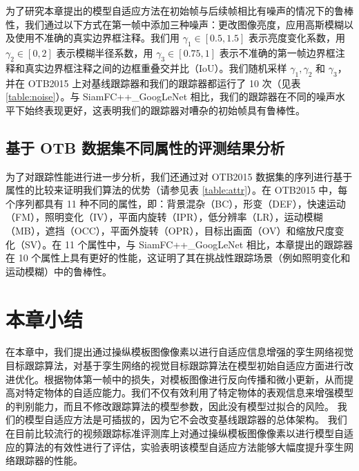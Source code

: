 为了研究本章提出的模型自适应方法在初始帧与后续帧相比有噪声的情况下的鲁棒性，我们通过以下方式在第一帧中添加三种噪声：更改图像亮度，应用高斯模糊以及使用不准确的真实边界框注释。我们用 $\gamma_1 \in [0.5, 1.5]$ 表示亮度变化系数，用 $\gamma_2 \in [0, 2]$ 表示模糊半径系数，用 $\gamma_3 \in [0.75, 1]$ 表示不准确的第一帧边界框注释和真实边界框注释之间的边框重叠交并比（IoU）。我们随机采样 $\gamma_1, \gamma_2$ 和 $\gamma_3$，并在 OTB2015 上对基线跟踪器和我们的跟踪器都运行了 10 次（见表 \ref{table:noise}）。与 SiamFC++\_GoogLeNet \cite{SiamFC++} 相比，我们的跟踪器在不同的噪声水平下始终表现更好，这表明我们的跟踪器对嘈杂的初始帧具有鲁棒性。%

\subsection{基于 OTB 数据集不同属性的评测结果分析}
为了对跟踪性能进行进一步分析，我们还通过对 OTB2015 数据集的序列进行基于属性的比较来证明我们算法的优势（请参见表 \ref{table:attr}）。在 OTB2015 中，每个序列都具有 11 种不同的属性，即：背景混杂（BC），形变（DEF），快速运动（FM），照明变化（IV），平面内旋转（IPR），低分辨率（LR），运动模糊（MB），遮挡（OCC），平面外旋转（OPR），目标出画面（OV）和缩放尺度变化（SV）。在 11 个属性中，与 SiamFC++\_GoogLeNet \cite{SiamFC++} 相比，本章提出的跟踪器在 10 个属性上具有更好的性能，这证明了其在挑战性跟踪场景（例如照明变化和运动模糊）中的鲁棒性。

\begin{table}[t!]
\centering
\caption{基于评测库 OTB2015 的 11 个属性标注的算法跟踪成功率对比展示。}
\label{table:attr}
\end{table}

\section{本章小结}
在本章中，我们提出通过操纵模板图像像素以进行自适应信息增强的孪生网络视觉目标跟踪算法，对基于孪生网络的视觉目标跟踪算法在模型初始自适应方面进行改进优化。根据物体第一帧中的损失，对模板图像进行反向传播和微小更新，从而提高对特定物体的自适应能力。我们不仅有效利用了特定物体的表观信息来增强模型的判别能力，而且不修改跟踪算法的模型参数，因此没有模型过拟合的风险。
我们的模型自适应方法是可插拔的，因为它不会改变基线跟踪器的总体架构。
我们在目前比较流行的视频跟踪标准评测库上对通过操纵模板图像像素以进行模型自适应的算法的有效性进行了评估，实验表明该模型自适应方法能够大幅度提升孪生网络跟踪器的性能。